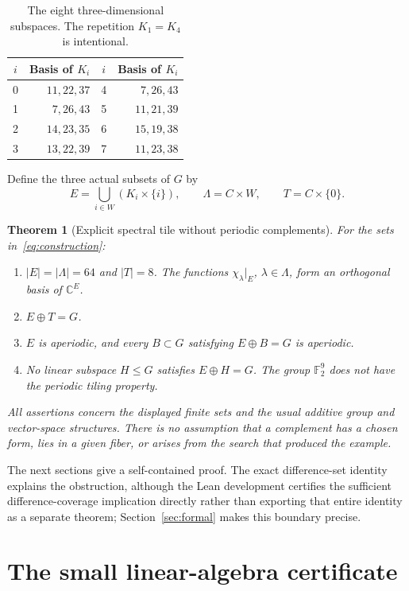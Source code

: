 \documentclass[11pt]{article}
\newtheorem{theorem}{Theorem}
\theoremstyle{definition}\newtheorem{definition}[theorem]{Definition}
\theoremstyle{remark}\newtheorem{remark}[theorem]{Remark}
\newcommand{\F}{\mathbb F}
\newcommand{\C}{\mathbb C}
\begin{document}
\begin{table}[htbp]
\centering
\begin{tabular}{@{}cr@{\qquad}cr@{}}
\toprule
$i$&Basis of $K_i$&$i$&Basis of $K_i$\\
\midrule
0&$11,22,37$&4&$7,26,43$\\
1&$7,26,43$&5&$11,21,39$\\
2&$14,23,35$&6&$15,19,38$\\
3&$13,22,39$&7&$11,23,38$\\
\bottomrule
\end{tabular}
\caption{The eight three-dimensional subspaces. The repetition $K_1=K_4$ is intentional.}\label{tab:bases}
\end{table}

Define the three actual subsets of $G$ by
\begin{equation}\label{eq:construction}
E=\bigcup_{i\in W}(K_i\times\{i\}),\qquad
\Lambda=C\times W,\qquad T=C\times\{0\}.
\end{equation}

\begin{theorem}[Explicit spectral tile without periodic complements]\label{thm:main}
For the sets in~\eqref{eq:construction}:
\begin{enumerate}
\item $|E|=|\Lambda|=64$ and $|T|=8$. The functions $\chi_\lambda|_E$, $\lambda\in\Lambda$, form an orthogonal basis of $\C^E$.
\item $E\oplus T=G$.
\item $E$ is aperiodic, and every $B\subset G$ satisfying $E\oplus B=G$ is aperiodic.
\item No linear subspace $H\leq G$ satisfies $E\oplus H=G$. The group $\F_2^9$ does not have the periodic tiling property.
\end{enumerate}
All assertions concern the displayed finite sets and the usual additive group and vector-space structures. There is no assumption that a complement has a chosen form, lies in a given fiber, or arises from the search that produced the example.
\end{theorem}

The next sections give a self-contained proof. The exact difference-set identity explains the obstruction, although the Lean development certifies the sufficient difference-coverage implication directly rather than exporting that entire identity as a separate theorem; Section~\ref{sec:formal} makes this boundary precise.

\section{The small linear-algebra certificate}
\end{document}
